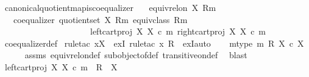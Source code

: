 \begin{isabellebody}
%
\endisadelimproof
\isanewline
{}\isamarkupfalse%
\ canonical{\isacharunderscore}{\kern0pt}quotient{\isacharunderscore}{\kern0pt}map{\isacharunderscore}{\kern0pt}is{\isacharunderscore}{\kern0pt}coequalizer{\isacharcolon}{\kern0pt}\isanewline
\ \ \ {\isachardoublequoteopen}equiv{\isacharunderscore}{\kern0pt}rel{\isacharunderscore}{\kern0pt}on\ X\ {\isacharparenleft}{\kern0pt}R{\isacharcomma}{\kern0pt}m{\isacharparenright}{\kern0pt}{\isachardoublequoteclose}\isanewline
\ \ \ {\isachardoublequoteopen}coequalizer\ {\isacharparenleft}{\kern0pt}quotient{\isacharunderscore}{\kern0pt}set\ X\ {\isacharparenleft}{\kern0pt}R{\isacharcomma}{\kern0pt}m{\isacharparenright}{\kern0pt}{\isacharparenright}{\kern0pt}\ {\isacharparenleft}{\kern0pt}equiv{\isacharunderscore}{\kern0pt}class\ {\isacharparenleft}{\kern0pt}R{\isacharcomma}{\kern0pt}m{\isacharparenright}{\kern0pt}{\isacharparenright}{\kern0pt}\isanewline
\ \ \ \ \ \ \ \ \ \ \ \ \ \ \ \ \ \ \ \ \ {\isacharparenleft}{\kern0pt}left{\isacharunderscore}{\kern0pt}cart{\isacharunderscore}{\kern0pt}proj\ X\ X\ {\isasymcirc}\isactrlsub c\ m{\isacharparenright}{\kern0pt}\ {\isacharparenleft}{\kern0pt}right{\isacharunderscore}{\kern0pt}cart{\isacharunderscore}{\kern0pt}proj\ X\ X\ {\isasymcirc}\isactrlsub c\ m{\isacharparenright}{\kern0pt}{\isachardoublequoteclose}\isanewline
%
\isadelimproof
\ \ %
\endisadelimproof
%
\isatagproof
{}\isamarkupfalse%
\ coequalizer{\isacharunderscore}{\kern0pt}def\ \isanewline
{}\isamarkupfalse%
{\isacharparenleft}{\kern0pt}rule{\isacharunderscore}{\kern0pt}tac\ x{\isacharequal}{\kern0pt}X\ \ exI{\isacharcomma}{\kern0pt}\ rule{\isacharunderscore}{\kern0pt}tac\ x{\isacharequal}{\kern0pt}\ {\isachardoublequoteopen}R{\isachardoublequoteclose}\ \ exI{\isacharcomma}{\kern0pt}auto{\isacharparenright}{\kern0pt}\isanewline
\ \ \isamarkupfalse%
\ m{\isacharunderscore}{\kern0pt}type{\isacharcolon}{\kern0pt}\ {\isachardoublequoteopen}m{\isacharcolon}{\kern0pt}\ R\ {\isasymrightarrow}X\ {\isasymtimes}\isactrlsub c\ X{\isachardoublequoteclose}\isanewline
\ \ \ \ \isamarkupfalse%
\ assms\ equiv{\isacharunderscore}{\kern0pt}rel{\isacharunderscore}{\kern0pt}on{\isacharunderscore}{\kern0pt}def\ subobject{\isacharunderscore}{\kern0pt}of{\isacharunderscore}{\kern0pt}def{}\ transitive{\isacharunderscore}{\kern0pt}on{\isacharunderscore}{\kern0pt}def\ \isamarkupfalse%
\ blast\isanewline
\ \ \isamarkupfalse%
\ {\isachardoublequoteopen}left{\isacharunderscore}{\kern0pt}cart{\isacharunderscore}{\kern0pt}proj\ X\ X\ {\isasymcirc}\isactrlsub c\ m\ {\isacharcolon}{\kern0pt}\ R\ {\isasymrightarrow}\ X{\isachardoublequoteclose}\isanewline

\end{isabellebody}
